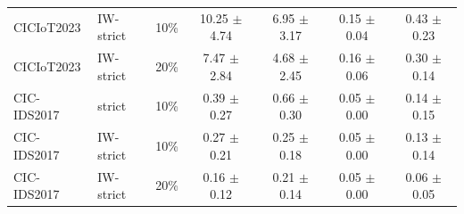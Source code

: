 \begin{table}[t]
\begin{tabular}{lllcccc}
CICIoT2023 & IW-strict & 10\% & 10.25 $\pm$ 4.74 & 6.95 $\pm$ 3.17 & 0.15 $\pm$ 0.04 & 0.43 $\pm$ 0.23 \\
CICIoT2023 & IW-strict & 20\% & 7.47 $\pm$ 2.84 & 4.68 $\pm$ 2.45 & 0.16 $\pm$ 0.06 & 0.30 $\pm$ 0.14 \\
CIC-IDS2017 & strict & 10\% & 0.39 $\pm$ 0.27 & 0.66 $\pm$ 0.30 & 0.05 $\pm$ 0.00 & 0.14 $\pm$ 0.15 \\
CIC-IDS2017 & IW-strict & 10\% & 0.27 $\pm$ 0.21 & 0.25 $\pm$ 0.18 & 0.05 $\pm$ 0.00 & 0.13 $\pm$ 0.14 \\
CIC-IDS2017 & IW-strict & 20\% & 0.16 $\pm$ 0.12 & 0.21 $\pm$ 0.14 & 0.05 $\pm$ 0.00 & 0.06 $\pm$ 0.05 \\
\bottomrule
\end{tabular}
\end{table}
